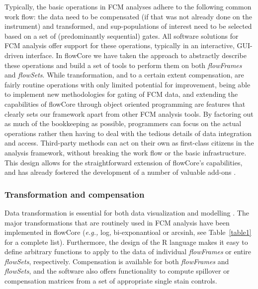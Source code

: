 \documentclass[12pt]{article}
\newcommand{\Rpackage}[1]{{\textsf{#1}}}
\newcommand{\Rclass}[1]{{\textit{#1}}}
\begin{document}
Typically, the basic operations in FCM analyses adhere to the
following common work flow: the data need to be compensated (if that
was not already done on the instrument) and transformed, and
sup-populations of interest need to be selected based on a set of
(predominantly sequential) gates. All software solutions for FCM
analysis offer support for these operations, typically in an
interactive, GUI-driven interface. In \Rpackage{flowCore} we have
taken the approach to abstractly describe these operations and build a
set of tools to perform them on both \Rclass{flowFrames} and
\Rclass{flowSets}. While transformation, and to a certain extent
compensation, are fairly routine operations with only limited
potential for improvement, being able to implement new methodologies
for gating of FCM data, and extending the capabilities of
\Rpackage{flowCore} through object oriented programming are features
that clearly sets our framework apart from other FCM analysis
tools. By factoring out as much of the bookkeeping as possible,
programmers can focus on the actual operations rather then having to
deal with the tedious details of data integration and
access. Third-party methods can act on their own as first-class
citizens in the analysis framework, without breaking the work flow or
the basic infrastructure. This design allows for the straightforward
extension of \Rpackage{flowCore}'s capabilities, and has already
fostered the development of a number of valuable add-ons
\citep{lo2008agf,sarkar2008ufv}.

\subsubsection*{Transformation and compensation}

Data transformation is essential for both data visualization and
modelling \citep{lo2008agf}. The major transformations that are
routinely used in FCM analysis have been implemented in
\Rpackage{flowCore} (\textit{e.g.,} log, bi-exponantioal or arcsinh,
see Table~\ref{table1} for a complete list). Furthermore, the design
of the R language makes it easy to define arbitrary functions to apply
to the data of individual \Rclass{flowFrames} or entire
\Rclass{flowSets}, respectively. Compensation is available for both
\Rclass{flowFrames} and \Rclass{flowSets}, and the software also
offers functionality to compute spillover or compensation matrices
from a set of appropriate single stain controls.
\end{document}
